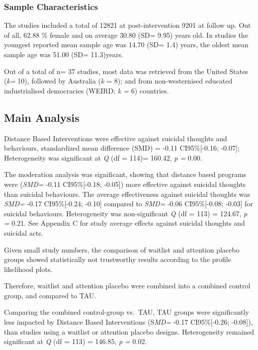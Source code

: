 \documentclass[
  english,
  man]{apa6}
\begin{document}
\hypertarget{sample-characteristics}{%
\subsubsection{Sample Characteristics}\label{sample-characteristics}}

The studies included a total of 12821 at post-intervention 9201 at follow up. Out of all, 62.88 \% female and on average 30.80 (SD= 9.95) years old. In studies the youngest reported mean sample age was 14.70 (SD= 1.4) years, the oldest mean sample age was 51.00 (SD= 11.3)years.

Out of a total of n= 37 studies, most data was retrieved from the United States (\emph{k=} 10), followed by Australia (\emph{k} = 8); and from non-westernised educated industrialised democracies (WEIRD; \emph{k =} 6) countries.

\hypertarget{main-analysis}{%
\subsection{Main Analysis}\label{main-analysis}}

Distance Based Interventions were effective against suicidal thoughts and behaviours, standardized mean difference (SMD) = -0.11 CI95\%{[}-0.16; -0.07{]}; Heterogeneity was significant at \emph{Q} (df = 114)= 160.42, \emph{p =} 0.00.

The moderation analysis was significant, showing that distance based programs were (\emph{SMD=} -0.11 CI95\%{[}-0.18; -0.05{]}) more effective against suicidal thoughts than suicidal behaviours. The average effectiveness against suicidal thoughts was \emph{SMD=} -0.17 CI95\%{[}-0.24; -0.10{]} compared to \emph{SMD=} -0.06 CI95\%{[}-0.08; -0.03{]} for suicidal behaviours. Heterogeneity was non-significant \emph{Q} (df = 113) = 124.67, \emph{p =} 0.21. See Appendix C for study average effects against suicidal thoughts and suicidal acts.

Given small study numbers, the comparison of waitlist and attention placebo groups showed statistically not trustworthy results according to the profile likelihood plots.

Therefore, waitlist and attention placebo were combined into a combined control group, and compared to TAU.

Comparing the combined control-group vs.~TAU, TAU groups were significantly less impacted by Distance Based Interventions (S\emph{MD=} -0.17 CI95\%{[}-0.26; -0.08{]}), than studies using a waitlist or attention placebo designs. Heterogeneity remained significant at \emph{Q} (df = 113) = 146.85, \emph{p =} 0.02.
\end{document}
